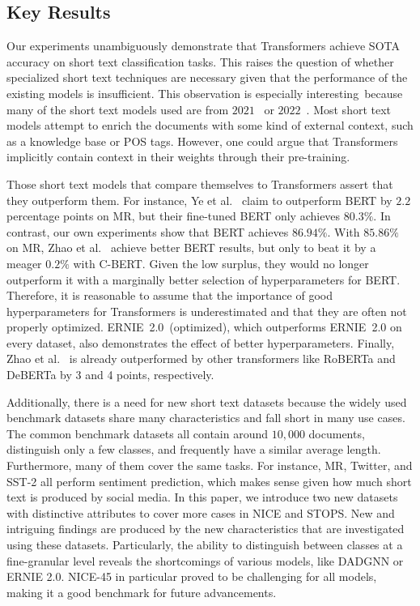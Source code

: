 \documentclass[runningheads]{llncs}
\begin{document}
\subsection{Key Results}
\label{sec:keyresults}

Our experiments unambiguously demonstrate that Transformers achieve \ac{SOTA} accuracy on short text classification tasks. This raises the question of whether specialized short text techniques are necessary given that the performance of the existing models is insufficient.
This observation is especially interesting because many of the short text models used are from $2021$~\cite{hgat,zhao2021sequential,liu2021deep,wang2021short} or $2022$~\cite{nc-hgat}.
Most short text models attempt to enrich the documents with some kind of external context, such as a knowledge base or \ac{POS} tags. However, one could argue that Transformers implicitly contain context in their weights through their pre-training.

Those short text models that compare themselves to Transformers assert that they outperform them.
For instance, Ye et al.~\cite{ye2020document} claim to outperform BERT by $2.2$ percentage points on MR, but their fine-tuned BERT only achieves $80.3\%$.
In contrast, our own experiments show that BERT achieves $86.94\%$.
With $85.86\%$ on MR, Zhao et al.~\cite{zhao2021sequential} achieve better BERT results, but only to beat it by a meager $0.2\%$ with C-BERT. Given the low surplus, they would no longer outperform it with a marginally better selection of hyperparameters for BERT.
Therefore, it is reasonable to assume that the importance of good hyperparameters for Transformers is underestimated and that they are often not properly optimized.
ERNIE~2.0~(optimized), which outperforms ERNIE~2.0 on every dataset, also demonstrates the effect of better hyperparameters.
Finally, Zhao et al.~\cite{zhao2021sequential} is already outperformed by other transformers like RoBERTa and DeBERTa by 3 and 4 points, respectively.

Additionally, there is a need for new short text datasets because the widely used benchmark datasets share many characteristics and fall short in many use cases.
The common benchmark datasets all contain around $10,000$ documents, distinguish only a few classes, and frequently have a similar average length. Furthermore, many of them cover the same tasks. For instance, MR, Twitter, and SST-2 all perform sentiment prediction, which makes sense given how much short text is produced by social media.
In this paper, we introduce two new datasets with distinctive attributes to cover more cases in NICE and STOPS. 
New and intriguing findings are produced by the new characteristics that are investigated using these datasets.
Particularly, the ability to distinguish between classes at a fine-granular level reveals the shortcomings of various models, like DADGNN or ERNIE 2.0.
NICE-45 in particular proved to be challenging for all models, making it a good benchmark for future advancements.
\end{document}
